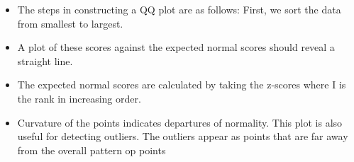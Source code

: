 \documentclass[]{report}
\begin{document}
\begin{itemize}
\item The steps in constructing a QQ plot are as follows: First, we sort the data from smallest to largest. 
\item A plot of these scores against the expected normal scores should reveal a straight line. \item The expected normal scores are calculated by taking the z-scores  where I is the rank in increasing order.
\end{itemize}


\begin{itemize}

\item Curvature of the points indicates departures of normality. This plot is also useful for detecting outliers. The outliers appear as points that are far away from the overall pattern op points
\end{itemize}
\end{document}

